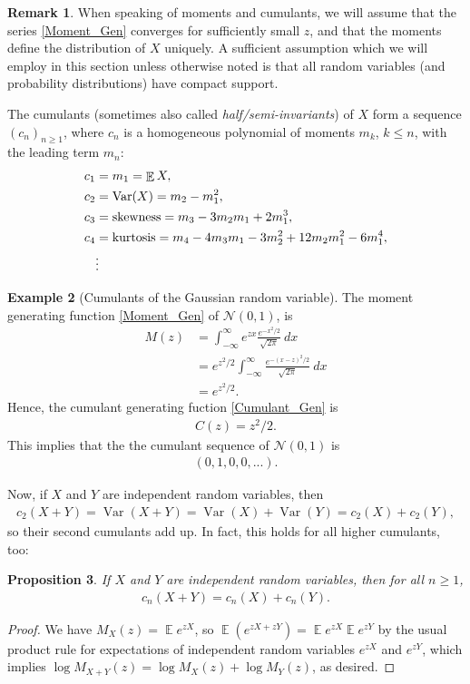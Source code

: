 \documentclass[letterpaper,11pt,oneside,reqno]{amsart}
\numberwithin{equation}{section}
\DeclareMathOperator{\EE}{\mathbb{E}}
\DeclareMathOperator{\VAR}{\mathrm{Var}}
\newtheorem{proposition}{Proposition}[section]
\theoremstyle{definition}
\newtheorem{remark}[proposition]{Remark}
\newtheorem{example}[proposition]{Example}
\begin{document}
\begin{remark}
	When speaking of moments and cumulants, we will assume that the series \eqref{Moment_Gen} 
	converges for sufficiently small $z$, and that the moments define the distribution of $X$
	uniquely. A sufficient assumption which we will employ in this section unless otherwise
	noted is that all random variables (and probability distributions)
	have compact support.
\end{remark}

The cumulants (sometimes also called \emph{half/semi-invariants}) of $X$ form a sequence $(c_n)_{n\ge1}$, where $c_n$ is a homogeneous polynomial of moments $m_k$, $k\leq n$, with the leading term $m_n$:
\begin{align*}
    c_1&=m_1=\EE X,\\
    c_2&=\VAR(X)=m_2-m_1^2,\\
    c_3&=\textnormal{skewness}=m_3-3m_2m_1+2m_1^3,\\
    c_4&=\textnormal{kurtosis}=m_4-4m_3m_1-3m_2^2+12m_2m_1^2-6m_1^4,\\
    &\vdots
\end{align*}

\begin{example}[Cumulants of the Gaussian random variable]\label{ex:Cumulant_Seq_Ga}
	The moment generating function \eqref{Moment_Gen} of $\mathcal{N}(0,1)$, is 
	\begin{align*}
	    M(z)&= \int_{-\infty}^\infty e^{zx} \frac{e^{-x^2/2}}{\sqrt{2\pi}}\ dx\\
	    &=e^{z^2/2}\int_{-\infty}^\infty \frac{e^{-(x-z)^2/2}}{\sqrt{2\pi}}\ dx\\
	    &=e^{z^2/2}.
	\end{align*}
	Hence, the cumulant generating fuction \eqref{Cumulant_Gen} is 
	\begin{align*}
	    C(z)=z^2/2.
	\end{align*}
	This implies that the the cumulant sequence of $\mathcal{N}(0,1)$ is 
	\begin{align}\label{Cumulant_Seq_Ga}
	    (0, 1, 0, 0, ...).
	\end{align}
\end{example}

Now, if $X$ and $Y$ are independent random variables, then 
\begin{align*}
	c_2(X+Y)=\VAR(X+Y)=\VAR(X)+\VAR(Y)=c_2(X)+c_2(Y),
\end{align*}
so their second cumulants add up.
In fact, this holds for all higher cumulants, too:
\begin{proposition}
If $X$ and $Y$ are independent random variables, then for all $n\geq 1$, 
\begin{align}\label{lin_cumulants}
c_n(X+Y)=c_n(X)+c_n(Y).
\end{align}
\end{proposition}
\begin{proof}
	We have
	$M_X(z)=\EE e^{zX}$, so 
	$\EE(e^{zX+zY})=\EE e^{zX}\EE e^{zY}$
	by the usual product rule for expectations of independent
	random variables $e^{zX}$ and  $e^{zY}$, which implies
	$\log M_{X+Y}(z)=\log M_X(z)+\log M_Y(z)$, as desired.
\end{proof}
\end{document}
